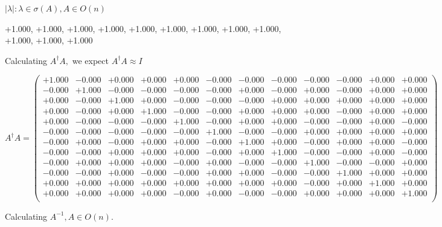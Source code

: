 \documentclass[9pt]{article}
\theoremstyle{plain}
\theoremstyle{definition}
\theoremstyle{remark}
\numberwithin{equation}{section}
\begin{document}
 $|\lambda | : \lambda \in \sigma(A) , A \in O(n)$

+1.000, +1.000, +1.000, +1.000, +1.000, +1.000, +1.000, +1.000, +1.000, +1.000, +1.000, +1.000


Calculating $A^{\dag} A,$  we expect $A^{\dag} A \approx I$

$A^{\dag} A = \left(
\begin{array}{
cccccccccccc}
+1.000 & -0.000 & +0.000 & +0.000 & +0.000 & -0.000 & -0.000 & -0.000 & -0.000 & -0.000 & +0.000 & +0.000 \\
-0.000 & +1.000 & -0.000 & -0.000 & -0.000 & -0.000 & +0.000 & -0.000 & +0.000 & -0.000 & +0.000 & +0.000 \\
+0.000 & -0.000 & +1.000 & +0.000 & -0.000 & -0.000 & -0.000 & +0.000 & +0.000 & +0.000 & +0.000 & +0.000 \\
+0.000 & -0.000 & +0.000 & +1.000 & -0.000 & -0.000 & +0.000 & +0.000 & +0.000 & -0.000 & +0.000 & +0.000 \\
+0.000 & -0.000 & -0.000 & -0.000 & +1.000 & -0.000 & +0.000 & +0.000 & -0.000 & -0.000 & +0.000 & -0.000 \\
-0.000 & -0.000 & -0.000 & -0.000 & -0.000 & +1.000 & -0.000 & -0.000 & +0.000 & +0.000 & +0.000 & +0.000 \\
-0.000 & +0.000 & -0.000 & +0.000 & +0.000 & -0.000 & +1.000 & +0.000 & -0.000 & +0.000 & +0.000 & -0.000 \\
-0.000 & -0.000 & +0.000 & +0.000 & +0.000 & -0.000 & +0.000 & +1.000 & -0.000 & -0.000 & +0.000 & -0.000 \\
-0.000 & +0.000 & +0.000 & +0.000 & -0.000 & +0.000 & -0.000 & -0.000 & +1.000 & -0.000 & -0.000 & +0.000 \\
-0.000 & -0.000 & +0.000 & -0.000 & -0.000 & +0.000 & +0.000 & -0.000 & -0.000 & +1.000 & +0.000 & +0.000 \\
+0.000 & +0.000 & +0.000 & +0.000 & +0.000 & +0.000 & +0.000 & +0.000 & -0.000 & +0.000 & +1.000 & +0.000 \\
+0.000 & +0.000 & +0.000 & +0.000 & -0.000 & +0.000 & -0.000 & -0.000 & +0.000 & +0.000 & +0.000 & +1.000 \\
\end{array}
\right)$ \newline 

Calculating $A^{-1} ,  A \in O(n)$.
\end{document}
